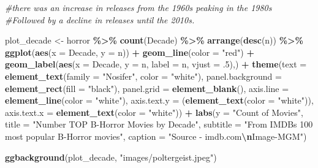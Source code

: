 \documentclass[
]{article}
\newenvironment{Shaded}{\begin{snugshade}}{\end{snugshade}}
\newcommand{\AttributeTok}[1]{\textcolor[rgb]{0.13,0.29,0.53}{#1}}
\newcommand{\CommentTok}[1]{\textcolor[rgb]{0.56,0.35,0.01}{\textit{#1}}}
\newcommand{\DecValTok}[1]{\textcolor[rgb]{0.00,0.00,0.81}{#1}}
\newcommand{\FunctionTok}[1]{\textcolor[rgb]{0.13,0.29,0.53}{\textbf{#1}}}
\newcommand{\NormalTok}[1]{#1}
\newcommand{\OtherTok}[1]{\textcolor[rgb]{0.56,0.35,0.01}{#1}}
\newcommand{\SpecialCharTok}[1]{\textcolor[rgb]{0.81,0.36,0.00}{\textbf{#1}}}
\newcommand{\StringTok}[1]{\textcolor[rgb]{0.31,0.60,0.02}{#1}}
\begin{document}
\begin{Shaded}
\begin{Highlighting}[]
\CommentTok{\#there was an increase in releases from the 1960\textquotesingle{}s peaking in the 1980s}
\CommentTok{\#Followed by a decline in releases until the 2010s. }

\NormalTok{plot\_decade }\OtherTok{\textless{}{-}}\NormalTok{ horror }\SpecialCharTok{\%\textgreater{}\%} 
  \FunctionTok{count}\NormalTok{(Decade) }\SpecialCharTok{\%\textgreater{}\%} 
  \FunctionTok{arrange}\NormalTok{(}\FunctionTok{desc}\NormalTok{(n)) }\SpecialCharTok{\%\textgreater{}\%} 
  \FunctionTok{ggplot}\NormalTok{(}\FunctionTok{aes}\NormalTok{(}\AttributeTok{x =}\NormalTok{ Decade, }\AttributeTok{y =}\NormalTok{ n)) }\SpecialCharTok{+} 
  \FunctionTok{geom\_line}\NormalTok{(}\AttributeTok{color =} \StringTok{"red"}\NormalTok{) }\SpecialCharTok{+}
  \FunctionTok{geom\_label}\NormalTok{(}\FunctionTok{aes}\NormalTok{(}\AttributeTok{x =}\NormalTok{ Decade, }\AttributeTok{y =}\NormalTok{ n, }\AttributeTok{label =}\NormalTok{ n, }\AttributeTok{vjust =}\NormalTok{ .}\DecValTok{5}\NormalTok{),) }\SpecialCharTok{+} 
  \FunctionTok{theme}\NormalTok{(}\AttributeTok{text =} \FunctionTok{element\_text}\NormalTok{(}\AttributeTok{family =} \StringTok{"Nosifer"}\NormalTok{, }\AttributeTok{color =} \StringTok{"white"}\NormalTok{),}
        \AttributeTok{panel.background =} \FunctionTok{element\_rect}\NormalTok{(}\AttributeTok{fill =} \StringTok{"black"}\NormalTok{), }
        \AttributeTok{panel.grid =} \FunctionTok{element\_blank}\NormalTok{(), }
        \AttributeTok{axis.line =} \FunctionTok{element\_line}\NormalTok{(}\AttributeTok{color =} \StringTok{"white"}\NormalTok{), }
        \AttributeTok{axis.text.y =}\NormalTok{ (}\FunctionTok{element\_text}\NormalTok{(}\AttributeTok{color =} \StringTok{"white"}\NormalTok{)), }
        \AttributeTok{axis.text.x =} \FunctionTok{element\_text}\NormalTok{(}\AttributeTok{color =} \StringTok{"white"}\NormalTok{)) }\SpecialCharTok{+}
  \FunctionTok{labs}\NormalTok{(}\AttributeTok{y =} \StringTok{"Count of Movies"}\NormalTok{, }
       \AttributeTok{title =} \StringTok{"Number TOP B{-}Horror Movies by Decade"}\NormalTok{, }
       \AttributeTok{subtitle =} \StringTok{"From IMDB\textquotesingle{}s 100 most popular B{-}Horror movies"}\NormalTok{,}
       \AttributeTok{caption =} \StringTok{"Source {-} imdb.com}\SpecialCharTok{\textbackslash{}n}\StringTok{Image{-}MGM"}\NormalTok{)}

\FunctionTok{ggbackground}\NormalTok{(plot\_decade, }\StringTok{"images/poltergeist.jpeg"}\NormalTok{)}
\end{Highlighting}
\end{Shaded}
\end{document}
